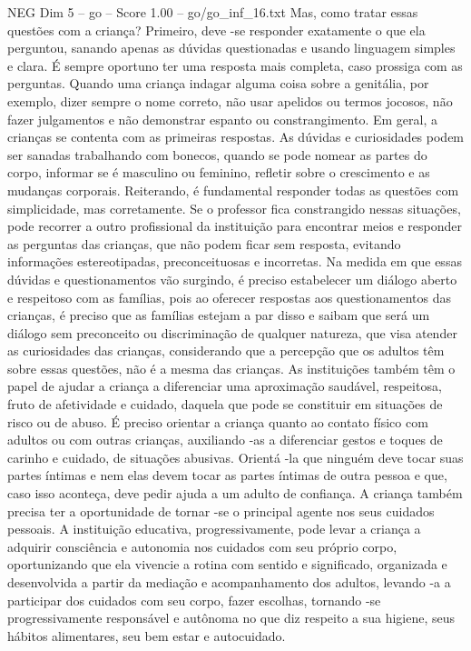 \begin{textsample}{NEG Dim 5 – go – Score 1.00 – go/go\_inf\_16.txt}
Mas, como tratar essas questões com a criança?
Primeiro, deve -se responder exatamente o que ela perguntou, sanando apenas as dúvidas questionadas e usando linguagem simples e clara.
É sempre oportuno ter uma resposta mais completa, caso prossiga com as perguntas.
Quando uma criança indagar alguma coisa sobre a genitália, por exemplo, dizer sempre o nome correto, não usar apelidos ou termos jocosos, não fazer julgamentos e não demonstrar espanto ou constrangimento.
Em geral, a crianças se contenta com as primeiras respostas.
As dúvidas e curiosidades podem ser sanadas trabalhando com bonecos, quando se pode nomear as partes do corpo, informar se é masculino ou feminino, refletir sobre o crescimento e as mudanças corporais.
Reiterando, é fundamental responder todas as questões com simplicidade, mas corretamente.
Se o professor fica constrangido nessas situações, pode recorrer a outro profissional da instituição para encontrar meios e responder as perguntas das crianças, que não podem ficar sem resposta, evitando informações estereotipadas, preconceituosas e incorretas.
Na medida em que essas dúvidas e questionamentos vão surgindo, é preciso estabelecer um diálogo aberto e respeitoso com as famílias, pois ao oferecer respostas aos questionamentos das crianças, é preciso que as famílias estejam a par disso e saibam que será um diálogo sem preconceito ou discriminação de qualquer natureza, que visa atender as curiosidades das crianças, considerando que a percepção que os adultos têm sobre essas questões, não é a mesma das crianças.
As instituições também têm o papel de ajudar a criança a diferenciar uma aproximação saudável, respeitosa, fruto de afetividade e cuidado, daquela que pode se constituir em situações de risco ou de abuso.
É preciso orientar a criança quanto ao contato físico com adultos ou com outras crianças, auxiliando -as a diferenciar gestos e toques de carinho e cuidado, de situações abusivas.
Orientá -la que ninguém deve tocar suas partes íntimas e nem elas devem tocar as partes íntimas de outra pessoa e que, caso isso aconteça, deve pedir ajuda a um adulto de confiança.
A criança também precisa ter a oportunidade de tornar -se o principal agente nos seus cuidados pessoais.
A instituição educativa, progressivamente, pode levar a criança a adquirir consciência e autonomia nos cuidados com seu próprio corpo, oportunizando que ela vivencie a rotina com sentido e significado, organizada e desenvolvida a partir da mediação e acompanhamento dos adultos, levando -a a participar dos cuidados com seu corpo, fazer escolhas, tornando -se progressivamente responsável e autônoma no que diz respeito a sua higiene, seus hábitos alimentares, seu bem estar e autocuidado.

\end{textsample}

